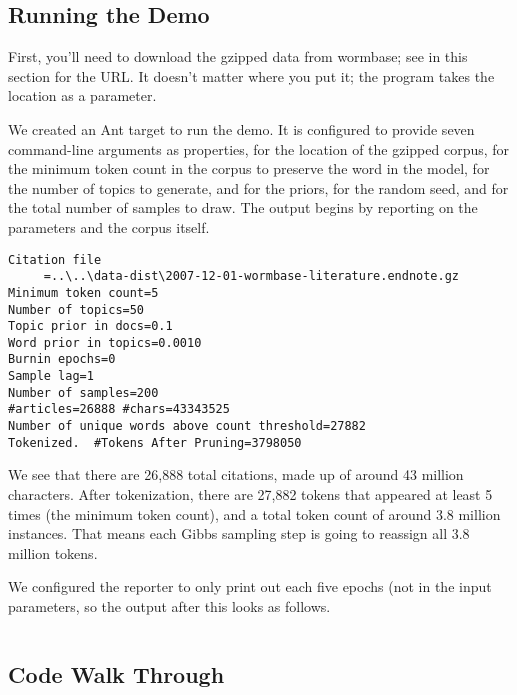 \subsection{Running the Demo}

First, you'll need to download the gzipped data from wormbase; see
 in this section for the URL.  It
doesn't matter where you put it; the program takes the location as
a parameter.

We created an Ant target  to run the demo.  It is
configured to provide seven command-line arguments as properties,
 for the location of the gzipped corpus,
 for the minimum token count in the corpus to
preserve the word in the model,  for the number of
topics to generate,  and  for the
priors,  for the random seed, and 
for the total number of samples to draw.
%
%
The output begins by reporting on the parameters and the corpus itself.
%
\begin{verbatim}
Citation file
     =..\..\data-dist\2007-12-01-wormbase-literature.endnote.gz
Minimum token count=5
Number of topics=50
Topic prior in docs=0.1
Word prior in topics=0.0010
Burnin epochs=0
Sample lag=1
Number of samples=200
#articles=26888 #chars=43343525
Number of unique words above count threshold=27882
Tokenized.  #Tokens After Pruning=3798050
\end{verbatim}
%
We see that there are 26,888 total citations, made up of around 43
million characters.  After tokenization, there are 27,882 tokens that
appeared at least 5 times (the minimum token count), and a total token
count of around 3.8 million instances.  That means each Gibbs sampling
step is going to reassign all 3.8 million tokens.

We configured the reporter to only print out each five epochs (not
in the input parameters, so the output after this looks as follows.
%
\begin{verbatim}

\end{verbatim}


\subsection{Code Walk Through}

